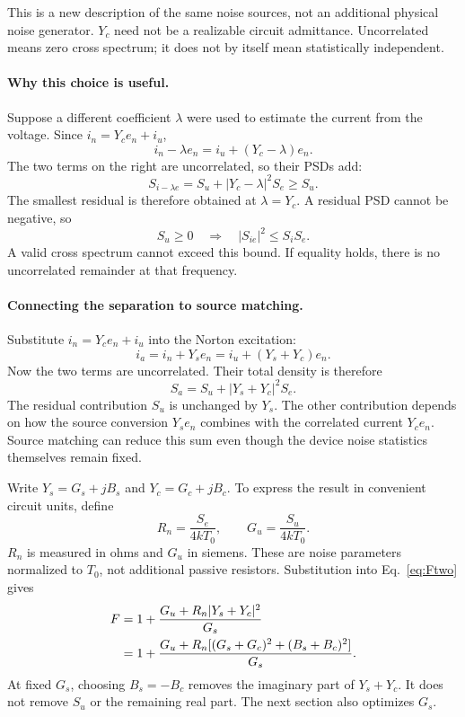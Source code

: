 This is a new description of the same noise sources, not an additional physical noise generator. $Y_c$ need not be a realizable circuit admittance. Uncorrelated means zero cross spectrum; it does not by itself mean statistically independent.

\paragraph{Why this choice is useful.}
Suppose a different coefficient $\lambda$ were used to estimate the current from the voltage. Since $i_n=Y_ce_n+i_u$,
\[
i_n-\lambda e_n=i_u+(Y_c-\lambda)e_n.
\]
The two terms on the right are uncorrelated, so their PSDs add:
\[
S_{i-\lambda e}=S_u+|Y_c-\lambda|^2S_e\geq S_u.
\]
The smallest residual is therefore obtained at $\lambda=Y_c$. A residual PSD cannot be negative, so
\[
S_u\geq0\quad\Longrightarrow\quad |S_{ie}|^2\leq S_iS_e.
\]
A valid cross spectrum cannot exceed this bound. If equality holds, there is no uncorrelated remainder at that frequency.



\paragraph{Connecting the separation to source matching.}
Substitute $i_n=Y_ce_n+i_u$ into the Norton excitation:
\[
i_a=i_n+Y_se_n=i_u+(Y_s+Y_c)e_n.
\]
Now the two terms are uncorrelated. Their total density is therefore
\[
S_a=S_u+|Y_s+Y_c|^2S_e.
\]
The residual contribution $S_u$ is unchanged by $Y_s$. The other contribution depends on how the source conversion $Y_se_n$ combines with the correlated current $Y_ce_n$. Source matching can reduce this sum even though the device noise statistics themselves remain fixed.

Write $Y_s=G_s+jB_s$ and $Y_c=G_c+jB_c$. To express the result in convenient circuit units, define
\[
R_n=\frac{S_e}{4kT_0},\qquad G_u=\frac{S_u}{4kT_0}.
\]
$R_n$ is measured in ohms and $G_u$ in siemens. These are noise parameters normalized to $T_0$, not additional passive resistors. Substitution into Eq.~\eqref{eq:Ftwo} gives
\begin{align}
F&=1+\frac{G_u+R_n|Y_s+Y_c|^2}{G_s}\notag\\
&=1+\frac{G_u+R_n[(G_s+G_c)^2+(B_s+B_c)^2]}{G_s}.
\label{eq:Fadmittance}
\end{align}
At fixed $G_s$, choosing $B_s=-B_c$ removes the imaginary part of $Y_s+Y_c$. It does not remove $S_u$ or the remaining real part. The next section also optimizes $G_s$.

